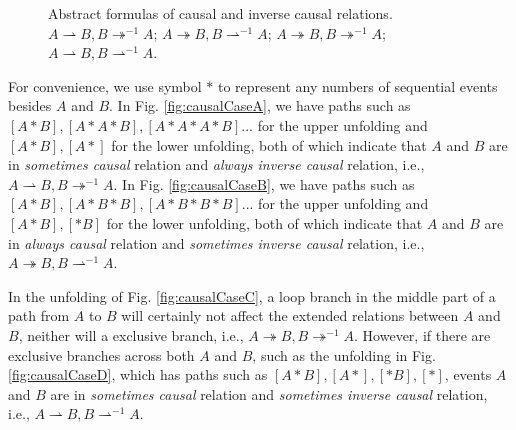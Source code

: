 \documentclass{llncs}
\begin{document}
\begin{figure}[ht]
{\begin{minipage}[b]{0.45\textwidth}
	\end{minipage}
	\label{fig:causalCaseC}
}
\caption{Abstract formulas of causal and inverse causal relations.  $A\rightharpoonup B, B\twoheadrightarrow^{-1}A$;  $A\twoheadrightarrow B, B\rightharpoonup^{-1}A$;  $A\twoheadrightarrow B, B\twoheadrightarrow^{-1}A$;  $A\rightharpoonup B, B\rightharpoonup^{-1}A$.}
\label{fig:causalCases}
\end{figure}

For convenience, we use symbol $*$ to represent any numbers of sequential events besides $A$ and $B$. In Fig. \ref{fig:causalCaseA}, we have paths such as $[A*B],[A*A*B],[A*A*A*B]...$ for the upper unfolding and $[A*B],[A*]$ for the lower unfolding, both of which indicate that $A$ and $B$ are in \textit{sometimes causal} relation and \textit{always inverse causal} relation, i.e., $A\rightharpoonup B,B\twoheadrightarrow^{-1}A$. In Fig. \ref{fig:causalCaseB}, we have paths such as $[A*B],[A*B*B],[A*B*B*B]...$ for the upper unfolding and $[A*B],[*B]$ for the lower unfolding, both of which indicate that $A$ and $B$ are in \textit{always causal} relation and \textit{sometimes inverse causal} relation, i.e., $A\twoheadrightarrow B,B\rightharpoonup^{-1}A$.

In the unfolding of Fig. \ref{fig:causalCaseC}, a loop branch in the middle part of a path from $A$ to $B$ will certainly not affect the extended relations between $A$ and $B$, neither will a exclusive branch, i.e., $A\twoheadrightarrow B,B\twoheadrightarrow^{-1}A$. However, if there are exclusive branches across both $A$ and $B$, such as the unfolding in Fig. \ref{fig:causalCaseD}, which has paths such as $[A*B],[A*],[*B],[*]$, events $A$ and $B$ are in \textit{sometimes causal} relation and \textit{sometimes inverse causal} relation, i.e., $A\rightharpoonup B,B\rightharpoonup^{-1}A$.
\end{document}
